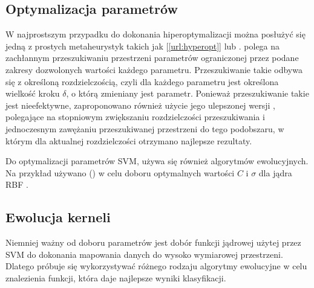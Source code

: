 \subsection{Optymalizacja parametrów}
\label{ssec:hyperopt}
W najprostszym przypadku do dokonania hiperoptymalizacji można posłużyć się jedną z prostych metaheurystyk takich jak  [\ref{url:hyperopt}] lub  \cite{practical_2003}.  polega na zachłannym przeszukiwaniu przestrzeni parametrów ograniczonej przez podane zakresy dozwolonych wartości każdego parametru. Przeszukiwanie takie odbywa się z określoną rozdzielczością, czyli dla każdego parametru jest określona wielkość kroku $ \delta $, o którą zmieniany jest parametr. Ponieważ przeszukiwanie takie jest nieefektywne, zaproponowano również użycie jego ulepszonej wersji \cite{staelin_parameter_2003}, polegające na stopniowym zwiększaniu rozdzielczości przeszukiwania i jednoczesnym zawężaniu przeszukiwanej przestrzeni do tego podobszaru, w którym dla aktualnej rozdzielczości otrzymano najlepsze rezultaty.


Do optymalizacji parametrów SVM, używa się również algorytmów ewolucyjnych. Na przykład używano  () w celu doboru optymalnych wartości $ C $ i $ \sigma $ dla jądra RBF \cite{runarsson_asynchronous_2004}.

\subsection{Ewolucja kerneli}
\label{sec:evokernel}
Niemniej ważny od doboru parametrów jest dobór funkcji jądrowej użytej przez SVM do dokonania mapowania danych do wysoko wymiarowej przestrzeni. Dlatego próbuje się wykorzystywać różnego rodzaju algorytmy ewolucyjne w celu znalezienia funkcji, która daje najlepsze wyniki klasyfikacji.

